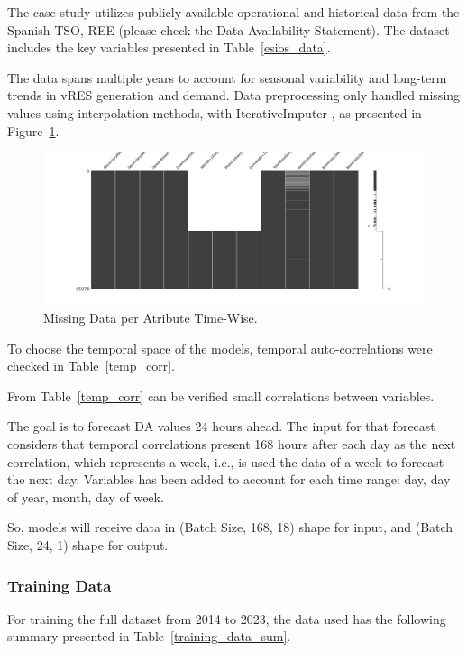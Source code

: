 The case study utilizes publicly available operational and historical data from the Spanish \gls{TSO}, \gls{REE} (please check the Data Availability Statement). The dataset includes the key variables presented in Table~\ref{esios_data}.



The data spans multiple years to account for seasonal variability and long-term trends in vRES generation and demand. Data preprocessing only handled missing values using interpolation methods, with IterativeImputer \cite{vanBuuren2011,Buck1960}, as presented in Figure~\ref{fig:misisng_data}.

\begin{figure}[H]
    \centering
    \includegraphics[width=\textwidth]{plots/missing_data.png}
    \caption{Missing Data per Atribute Time-Wise.}
    \label{fig:misisng_data}
  \end{figure}

To choose the temporal space of the models, temporal auto-correlations were checked in Table~\ref{temp_corr}.



From Table~\ref{temp_corr} can be verified small correlations between variables. 

The goal is to forecast \gls{DA} values 24 hours ahead. The input for that forecast considers that temporal correlations present 168 hours after each day as the next correlation, which represents a week, i.e., is used the data of a week to forecast the next day.
Variables has been added to account for each time range: day, day of year, month, day of week.\par
So, models will receive data in (Batch Size, 168, 18) shape for input, and (Batch Size, 24, 1) shape for output.

\subsubsection{Training Data}
For training the full dataset from 2014 to 2023, the data used has the following summary presented in Table~\ref{training_data_sum}.

